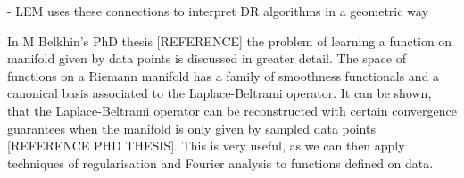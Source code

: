 \documentclass[journal, a4paper]{IEEEtran}
\begin{document}
- LEM uses these connections to interpret DR algorithms in a geometric way %



In M Belkhin's PhD thesis [REFERENCE] the problem of learning a function on manifold given by data points is discussed in greater detail. The space of functions on a Riemann manifold has a family of smoothness functionals and a canonical basis associated to the Laplace-Beltrami operator. It can be shown, that the Laplace-Beltrami operator can be reconstructed with certain convergence guarantees when the manifold is only given by sampled data points [REFERENCE PHD THESIS]. This is very useful, as we can then apply techniques of regularisation and Fourier analysis to functions defined on data. 
 
 
\end{document}

